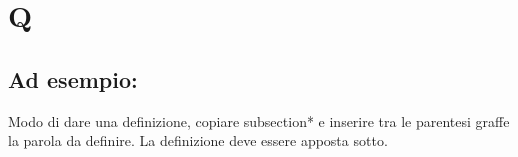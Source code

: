 \section*{Q}
\markright{}
\subsection*{Ad esempio:}
Modo di dare una definizione, copiare subsection*{} e inserire tra le parentesi graffe la parola da definire. La definizione deve essere apposta sotto.